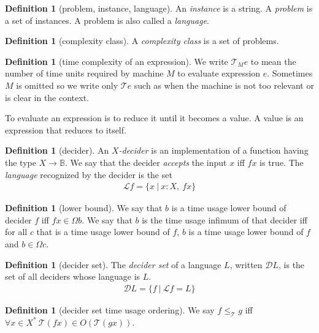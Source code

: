 \documentclass[10pt,statementpaper]{memoir}
\theoremstyle{definition}
\newcounter{thmctr}
\newtheorem{mdef}[thmctr]{Definition}
\newcommand\decset{\mathcal D}
\newcommand\langset{\mathcal L}
\newcommand\TC{\mathcal{T}}
\newcommand\leTC{\ensuremath{\le_\TC}}
\begin{document}
\begin{mdef}[problem, instance, language]
    An \emph{instance} is a string.
    A \emph{problem} is a set of instances.
    A problem is also called a \emph{language}.
\end{mdef}

\begin{mdef}[complexity class]
    A \emph{complexity class} is a set of problems.
\end{mdef}

\begin{mdef}[time complexity of an expression]
    We write $\TC_M e$ to mean the number of time units required by machine $M$
    to evaluate expression $e$.
    Sometimes $M$ is omitted so we write only $\TC e$
    such as when the machine is not too relevant
    or is clear in the context.

    To evaluate an expression is to reduce it until it becomes a value.
    A value is an expression that reduces to itself.
\end{mdef}

\begin{mdef}[decider]
An \emph{$X$-decider} is an implementation of a function having the type $X \to \mathbb B$.
We say that the decider \emph{accepts} the input $x$ iff $fx$ is true.
The \emph{language} recognized by the decider is the set
\begin{align*}
    \langset f = \{ x ~|~ x : X, ~ fx \}
\end{align*}
\end{mdef}

\begin{mdef}[lower bound]
    We say that $b$ is a time usage lower bound of decider $f$ iff $fx \in \Omega b$.
    We say that $b$ is the time usage infimum of that decider iff
    for all $c$ that is a time usage lower bound of $f$,
    $b$ is a time usage lower bound of $f$ and $b \in \Omega c$.
\end{mdef}

\begin{mdef}[decider set]
    The \emph{decider set} of a language $L$, written $\decset L$, is
    the set of all deciders whose language is $L$.
    \begin{align}
        \decset L = \{ f ~|~ \langset f = L \}
    \end{align}
\end{mdef}

\begin{mdef}[decider set time usage ordering]
    We say $f \leTC g$ iff $\forall x \in X^* ~ \TC(fx) \in O(\TC(gx))$.
\end{mdef}
\end{document}
